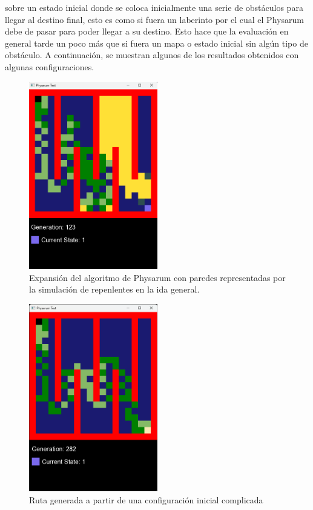         sobre un estado inicial donde se coloca inicialmente una
        serie de obst\'aculos para llegar al destino final, esto es como
        si fuera un laberinto por el cual el Physarum debe de pasar
        para poder llegar a su destino. Esto hace que la evaluaci\'on
        en general tarde un poco m\'as que si fuera un mapa o estado
        inicial sin alg\'un tipo de obst\'aculo.
    \vskip 0.5cm
    A continuaci\'on, se muestran algunos de los resultados
        obtenidos con algunas configuraciones.
    \vskip 0.5cm
    \begin{figure}[htbp]
        \centering
        \includegraphics[width=0.5\textwidth]{./images/Pruebas/simulador/image061.png}
        \caption{Expansi\'on del algoritmo de Physarum con paredes representadas por la simulaci\'on de repenlentes en la ida general.}
        \label{fig:Ruta 61}
    \end{figure}
    \vskip 0.5cm
    \begin{figure}[htbp]
        \centering
        \includegraphics[width=0.5\textwidth]{./images/Pruebas/simulador/image063.png}
        \caption{Ruta generada a partir de una configuraci\'on inicial complicada}
        \label{fig:Ruta 63}
    \end{figure}
